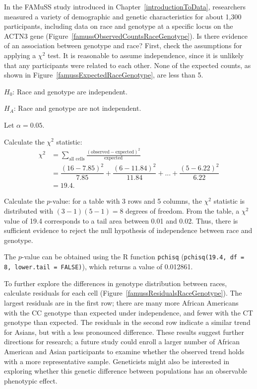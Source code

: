 
\begin{examplewrap}
  \begin{nexample}
    {In the FAMuSS study introduced in Chapter~\ref{introductionToData}, researchers measured a variety of demographic and genetic characteristics for about 1,300 participants, including data on race and genotype at a specific locus on the ACTN3 gene (Figure~\ref{famussObservedCountsRaceGenotype}).
    Is there evidence of an association between genotype and race?} First, check the assumptions for applying a $\chi^2$ test. It is reasonable to assume independence, since it is unlikely that any participants were related to each other. None of the expected counts, as shown in Figure~\ref{famussExpectedRaceGenotype}, are less than 5.

$H_0$: Race and genotype are independent.

$H_A$: Race and genotype are not independent.

Let $\alpha = 0.05$.

Calculate the $\chi^2$ statistic:
\begin{align*}
\chi^2 &= \sum_{\text{all cells}} \frac{(\text{observed} - \text{expected})^2}{\text{expected}} \\
&= \dfrac{(16-7.85)^2}{7.85} + \dfrac{(6-11.84)^2}{11.84} + ... + \dfrac{(5 - 6.22)^2}{6.22} \\
&=19.4.
\end{align*}	

Calculate the $p$-value: for a table with 3 rows and 5 columns, the $\chi^2$ statistic is distributed with $(3-1)(5-1) = 8$ degrees of freedom. From the table, a $\chi^2$ value of 19.4 corresponds to a tail area between 0.01 and 0.02. Thus, there is sufficient evidence to reject the null hypothesis of independence between race and genotype.

The $p$-value can be obtained using the \textsf{R} function \texttt{pchisq} (\texttt{pchisq(19.4, df = 8, lower.tail = FALSE)}), which returns a value of 0.012861. %

To further explore the differences in genotype distribution between races, calculate residuals for each cell (Figure~\ref{famussResidualsRaceGenotype}). The largest residuals are in the first row; there are many more African Americans with the CC genotype than expected under independence, and fewer with the CT genotype than expected. The residuals in the second row indicate a similar trend for Asians, but with a less pronounced difference. These results suggest further directions for research; a future study could enroll a larger number of African American and Asian participants to examine whether the observed trend holds with a more representative sample. Geneticists might also be interested in exploring whether this genetic difference between populations has an observable phenotypic \mbox{effect}.
\end{nexample}
\end{examplewrap}


